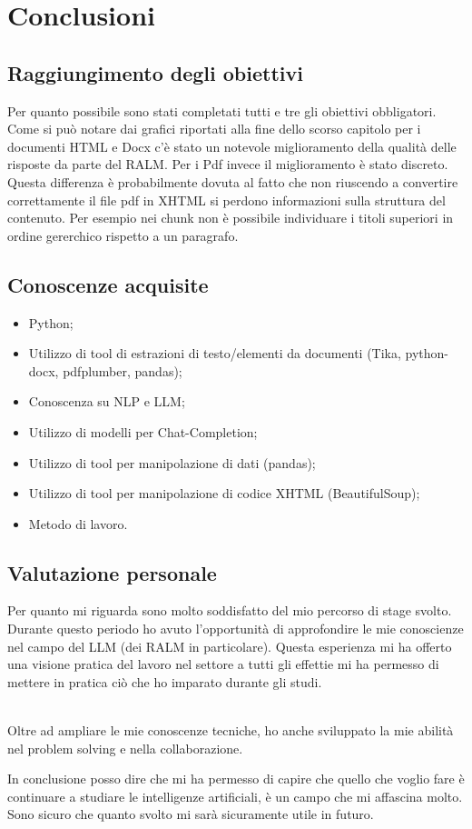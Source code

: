 \chapter{Conclusioni}
\label{cap:conclusioni}

\section{Raggiungimento degli obiettivi}
Per quanto possibile sono stati completati tutti e tre gli obiettivi obbligatori.
Come si può notare dai grafici riportati alla fine dello scorso capitolo per i documenti HTML e Docx c'è stato un notevole miglioramento della qualità delle risposte da parte del RALM.
Per i Pdf invece il miglioramento è stato discreto.
Questa differenza è probabilmente dovuta al fatto che non riuscendo a convertire correttamente il file pdf in XHTML si perdono informazioni sulla struttura del contenuto.
Per esempio nei chunk non è possibile individuare i titoli superiori in ordine gererchico rispetto a un paragrafo.

\section{Conoscenze acquisite}
\begin{itemize}
    \item Python;
    \item Utilizzo di tool di estrazioni di testo/elementi da documenti (Tika, python-docx, pdfplumber, pandas);
    \item Conoscenza su NLP e LLM;
    \item Utilizzo di modelli per Chat-Completion;
    \item Utilizzo di tool per manipolazione di dati (pandas);
    \item Utilizzo di tool per manipolazione di codice XHTML (BeautifulSoup);
    \item Metodo di lavoro.
\end{itemize}

\section{Valutazione personale}
Per quanto mi riguarda sono molto soddisfatto del mio percorso di stage svolto.
Durante questo periodo ho avuto l'opportunità di approfondire le mie conoscienze nel campo del LLM (dei RALM in particolare).
Questa esperienza mi ha offerto una visione pratica del lavoro nel settore a tutti gli effettie mi ha permesso di mettere in pratica ciò che ho imparato durante gli studi.

\\
Oltre ad ampliare le mie conoscenze tecniche, ho anche sviluppato la mie abilità nel problem solving e nella collaborazione.

In conclusione posso dire che mi ha permesso di capire che quello che voglio fare è continuare a studiare le intelligenze artificiali, è un campo che mi affascina molto.
Sono sicuro che quanto svolto mi sarà sicuramente utile in futuro.
